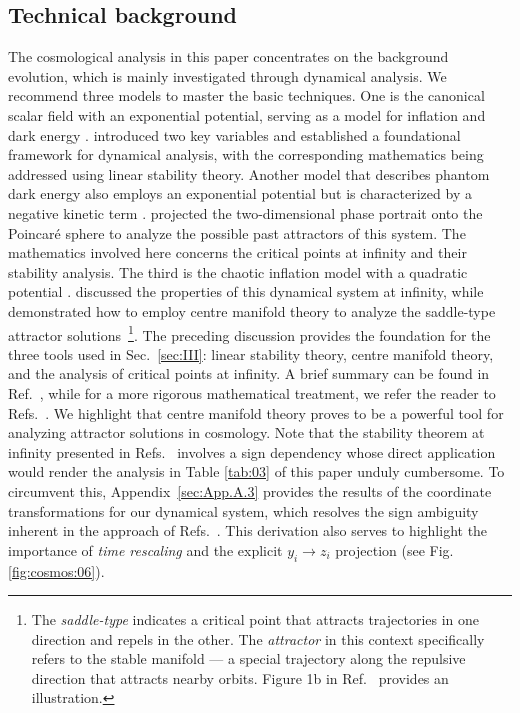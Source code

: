 \documentclass[aps,prd,twocolumn]{revtex4-2}
\begin{document}
\subsection{Technical background}\label{sec:I.C}
The cosmological analysis in this paper concentrates on the background evolution, which is mainly investigated through dynamical analysis. We recommend three models to master the basic techniques. One is the canonical scalar field with an exponential potential, serving as a model for inflation \cite{Lucchin1985.PRD.32.1316} and dark energy \cite{Ratra1988.PRD.37.3406}. \citet{Copeland1998.PRD.57.4686} introduced two key variables and established a foundational framework for dynamical analysis, with the corresponding mathematics being addressed using linear stability theory. Another model that describes phantom dark energy also employs an exponential potential but is characterized by a negative kinetic term \cite{Hao2003.PRD.67.107303}. \citet{Bahamonde2018.PhysRep.775.1} projected the two-dimensional phase portrait \cite{UrenaLopez2005.JCAP.09.013} onto the Poincar\'e sphere to analyze the possible past attractors of this system. The mathematics involved here concerns the critical points at infinity and their stability analysis. The third is the chaotic inflation model with a quadratic potential \cite{Linde1983.PLB.129.177}. \citet{Belinsky1985.PLB.155.232} discussed the properties of this dynamical system at infinity, while \citet{Rendall2002.GenRelativGravit.34.1277} demonstrated how to employ centre manifold theory to analyze the saddle-type attractor solutions~\footnote{The \textit{saddle-type} indicates a critical point that attracts trajectories in one direction and repels in the other. The \textit{attractor} in this context specifically refers to the stable manifold --- a special trajectory along the repulsive direction that attracts nearby orbits. Figure 1b in Ref.~\cite{Belinsky1985.PLB.155.232} provides an illustration.}. The preceding discussion provides the foundation for the three tools used in Sec.~\ref{sec:III}: linear stability theory, centre manifold theory, and the analysis of critical points at infinity. A brief summary can be found in Ref.~\cite{Bahamonde2018.PhysRep.775.1}, while for a more rigorous mathematical treatment, we refer the reader to Refs.~\cite{Lefschetz1957.book,Carr1981.book,Perko2001.book,Meiss2007.book}. We highlight that centre manifold theory proves to be a powerful tool for analyzing attractor solutions in cosmology. Note that the stability theorem at infinity presented in Refs.~\cite{Bahamonde2018.PhysRep.775.1,Perko2001.book} involves a sign dependency whose direct application would render the analysis in Table \ref{tab:03} of this paper unduly cumbersome. To circumvent this, Appendix~\ref{sec:App.A.3} provides the results of the coordinate transformations for our dynamical system, which resolves the sign ambiguity inherent in the approach of Refs.~\cite{Bahamonde2018.PhysRep.775.1,Perko2001.book}. This derivation also serves to highlight the importance of \textit{time rescaling} and the explicit $y_i\rightarrow z_i$ projection (see Fig. \ref{fig:cosmos:06}).
\end{document}
